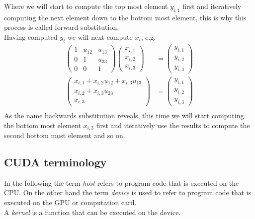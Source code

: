 Where we will start to compute the top most element $y_{i,1}$ first and iteratively computing the next element down to the bottom most element, this is why this process is called forward substitution.
\vspace{0.3cm}\\
Having computed $y_i$ we will next compute $x_i$, e.g.
\begin{align*}
\begin{pmatrix} 1 & u_{12} & u_{13}\\
0 & 1 & u_{23}\\
0 & 0 & 1
\end{pmatrix} \begin{pmatrix} x_{i,1} \\ x_{i,2} \\ x_{i,3}	\end{pmatrix}
& = \begin{pmatrix} y_{i,1} \\ y_{i,2} \\ y_{i,3}	\end{pmatrix}\\
\begin{pmatrix}
x_{i,1} + x_{i,2} u_{12} + x_{i,3} u_{13}\\ x_{i,2} + x_{i,3} u_{23}\\
x_{i,3}
\end{pmatrix}	& = \begin{pmatrix} y_{i,1} \\ y_{i,2} \\ y_{i,3}	\end{pmatrix}\\
\end{align*}
As the name backwards substitution reveals, this time we will start computing the bottom most element $x_{i,3}$ first and iteratively use the results to compute the second bottom most element and so on.

\subsection*{CUDA terminology}
In the following the term \emph{host} refers to program code that is executed on the CPU. On the other hand the term \emph{device} is used to refer to program code that is executed on the GPU or computation card.\\
A \emph{kernel} is a function that can be executed on the device.

